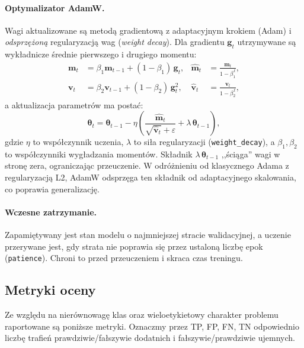 \documentclass[11pt,a4paper]{article}
\begin{document}
\paragraph{Optymalizator AdamW.}
Wagi aktualizowane są metodą gradientową z adaptacyjnym krokiem (Adam) i
\emph{odsprzężoną} regularyzacją wag (\emph{weight decay}). Dla gradientu
$\mathbf{g}_t$ utrzymywane są wykładnicze średnie pierwszego i drugiego momentu:
\begin{align}
\mathbf{m}_t &= \beta_1 \mathbf{m}_{t-1} + (1-\beta_1)\,\mathbf{g}_t, &
\hat{\mathbf{m}}_t &= \frac{\mathbf{m}_t}{1-\beta_1^{\,t}}, \\
\mathbf{v}_t &= \beta_2 \mathbf{v}_{t-1} + (1-\beta_2)\,\mathbf{g}_t^{2}, &
\hat{\mathbf{v}}_t &= \frac{\mathbf{v}_t}{1-\beta_2^{\,t}},
\end{align}
a aktualizacja parametrów ma postać:
\begin{equation}
\boldsymbol{\theta}_t = \boldsymbol{\theta}_{t-1}
- \eta\left(\frac{\hat{\mathbf{m}}_t}{\sqrt{\hat{\mathbf{v}}_t}+\varepsilon}
+ \lambda\,\boldsymbol{\theta}_{t-1}\right),
\label{eq:adamw}
\end{equation}
gdzie $\eta$ to współczynnik uczenia, $\lambda$ to siła regularyzacji
(\texttt{weight\_decay}), a $\beta_1, \beta_2$ to współczynniki wygładzania momentów.
Składnik $\lambda\,\boldsymbol{\theta}_{t-1}$ ,,ściąga'' wagi w stronę zera,
ograniczając przeuczenie. W odróżnieniu od klasycznego Adama z regularyzacją L2,
AdamW odsprzęga ten składnik od adaptacyjnego skalowania, co poprawia generalizację.

\paragraph{Wczesne zatrzymanie.}
Zapamiętywany jest stan modelu o najmniejszej stracie walidacyjnej, a uczenie
przerywane jest, gdy strata nie poprawia się przez ustaloną liczbę epok
(\texttt{patience}). Chroni to przed przeuczeniem i skraca czas treningu.

\subsection{Metryki oceny}

Ze względu na nierównowagę klas oraz wieloetykietowy charakter problemu raportowane
są poniższe metryki. Oznaczmy przez TP, FP, FN, TN odpowiednio liczbę trafień
prawdziwie/fałszywie dodatnich i fałszywie/prawdziwie ujemnych.
\end{document}
